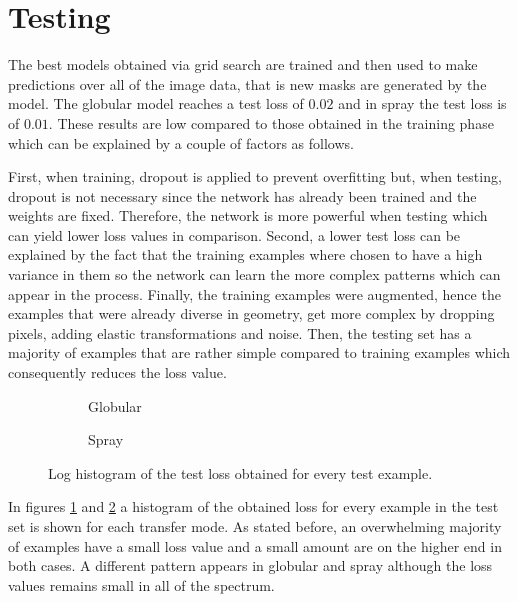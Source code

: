 \section{Testing}

The best models obtained via grid search are trained and then used to make predictions over all of the image data, that is new masks are generated by the model. The globular model reaches a test loss of $0.02$ and in spray the test loss is of $0.01$. These results are low compared to those obtained in the training phase which can be explained by a couple of factors as follows.

First, when training, dropout is applied to prevent overfitting but, when testing, dropout is not necessary since the network has already been trained and the weights are fixed. Therefore, the network is more powerful when testing which can yield lower loss values in comparison. Second, a lower test loss can be explained by the fact that the training examples where chosen to have a high variance in them so the network can learn the more complex patterns which can appear in the process. Finally, the training examples were augmented, hence the examples that were already diverse in geometry, get more complex by dropping pixels, adding elastic transformations and noise.
Then, the testing set has a majority of examples that are rather simple compared to training examples which consequently reduces the loss value. 
\begin{figure}
  \begin{subfigure}[b]{0.5\textwidth}
    
    \caption{Globular}
    \label{fig:globular_test_loss}
  \end{subfigure}
\hfill
  \begin{subfigure}[b]{0.5\textwidth}
    
    \caption{Spray}
    \label{fig:spray_test_loss}
  \end{subfigure}
  \caption[Log histogram of the test loss obtained for every example]{Log histogram of the test loss obtained for every test example.}
  \label{fig:test_loss_hist}
\end{figure}

In figures \ref{fig:globular_test_loss} and \ref{fig:spray_test_loss} a histogram of the obtained loss for every example in the test set is shown for each transfer mode. As stated before, an overwhelming majority of examples have a small loss value and a small amount are on the higher end in both cases. A different pattern appears in globular and spray although the loss values remains small in all of the spectrum.

